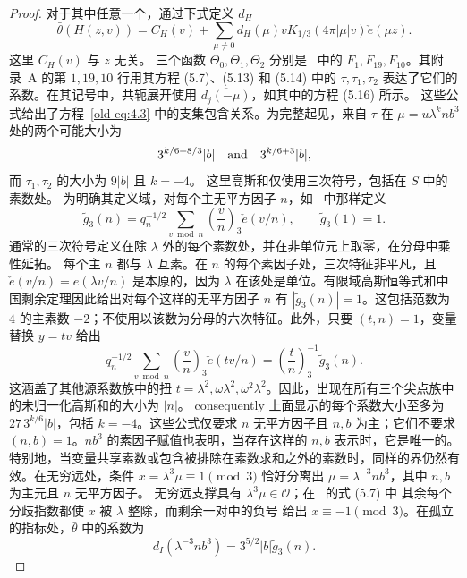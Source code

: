 \documentclass[11pt,a4paper]{article}
\numberwithin{equation}{section}
\numberwithin{figure}{section}
\theoremstyle{definition}
\theoremstyle{remark}
\begin{document}
\begin{proof}
对于其中任意一个，通过下式定义 $d_H$
\begin{equation}\label{eq:reflection-cusp-expansion}
 \bar\theta(H(z,v))=C_H(v)+
 \sum_{\mu\ne0}d_H(\mu)vK_{1/3}(4\pi|\mu|v)\check e(\mu z).
\end{equation}
这里 $C_H(v)$ 与 $z$ 无关。
三个函数 $\Theta_0,\Theta_1,\Theta_2$ 分别是~\cite{DR} 中的
$F_1,F_{19},F_{10}$。其附录~A 的第 $1,19,10$ 行用其方程 (5.7)、(5.13) 和 (5.14) 中的 $\tau,\tau_1,\tau_2$ 表达了它们的系数。在其记号中，共轭展开使用 $\overline{d_j(-\mu)}$，如其中的方程 (5.16) 所示。
这些公式给出了方程~\eqref{old-eq:4.3} 中的支集包含关系。为完整起见，来自 $\tau$ 在 $\mu=u\lambda^k n b^3$ 处的两个可能大小为
\[
 3^{k/6+8/3}|b|\quad\hbox{and}\quad3^{k/6+3}|b|,
\]
而 $\tau_1,\tau_2$ 的大小为 $9|b|$ 且 $k=-4$。
这里高斯和仅使用三次符号，包括在 $S$ 中的素数处。
为明确其定义域，对每个主无平方因子 $n$，如~\cite[Equation (1.7)]{DR} 中那样定义
\begin{equation}\label{eq:reflection-cubic-source-gauss}
 \widetilde g_3(n)=q_n^{-1/2}\sum_{v\bmod n}
       \left(\frac vn\right)_3\check e(v/n),
 \qquad \widetilde g_3(1)=1.
\end{equation}
通常的三次符号定义在除 $\lambda$ 外的每个素数处，并在非单位元上取零，在分母中乘性延拓。
每个主 $n$ 都与 $\lambda$ 互素。在 $n$ 的每个素因子处，三次特征非平凡，且 $\check e(v/n)=e(\lambda v/n)$ 是本原的，因为 $\lambda$ 在该处是单位。有限域高斯恒等式和中国剩余定理因此给出对每个这样的无平方因子 $n$ 有 $|\widetilde g_3(n)|=1$。这包括范数为 $4$ 的主素数 $-2$；不使用以该数为分母的六次特征。此外，只要 $(t,n)=1$，变量替换 $y=tv$ 给出
\[
 q_n^{-1/2}\sum_{v\bmod n}\left(\frac vn\right)_3\check e(tv/n)
       =\left(\frac tn\right)_3^{-1}\widetilde g_3(n).
\]
这涵盖了其他源系数族中的扭 $t=\lambda^2,\omega\lambda^2,\omega^2\lambda^2$。因此，出现在所有三个尖点族中的未归一化高斯和的大小为 $|n|$。 consequently 上面显示的每个系数大小至多为
$27\,3^{k/6}|b|$，包括 $k=-4$。这些公式仅要求
$n$ 无平方因子且 $n,b$ 为主；它们不要求
$(n,b)=1$。$nb^3$ 的素因子赋值也表明，当存在这样的 $n,b$ 表示时，它是唯一的。特别地，当变量共享素数或包含被排除在素数求和之外的素数时，同样的界仍然有效。在无穷远处，条件 $x=\lambda^3\mu\equiv1\pmod3$ 恰好分离出
$\mu=\lambda^{-3}nb^3$，其中 $n,b$ 为主元且 $n$ 无平方因子。
无穷远支撑具有 $\lambda^3\mu\in\mathcal O$；在~\cite{DR} 的式 (5.7) 中
其余每个分歧指数都使 $x$ 被 $\lambda$ 整除，而剩余一对中的负号
给出 $x\equiv-1\pmod3$。在孤立的指标处，$\bar\theta$ 中的系数为
\begin{equation}\label{eq:reflection-infinity-coefficient}
 d_I(\lambda^{-3}nb^3)=3^{5/2}|b|\widetilde g_3(n).

\end{equation}
\end{proof}
\end{document}
